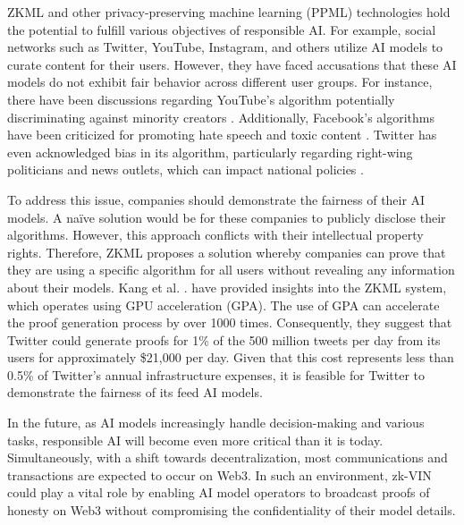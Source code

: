 \documentclass[conference]{IEEEtran}
\begin{document}
ZKML and other privacy-preserving machine learning (PPML) technologies hold the potential to fulfill various objectives of responsible AI. For example, social networks such as Twitter, YouTube, Instagram, and others utilize AI models to curate content for their users. However, they have faced accusations that these AI models do not exhibit fair behavior across different user groups. For instance, there have been discussions regarding YouTube's algorithm potentially discriminating against minority creators \cite{YoutubeAlgorithmHackernoon}. Additionally, Facebook's algorithms have been criticized for promoting hate speech and toxic content \cite{FacebookAlgorithmPeoplesDispatch}. Twitter has even acknowledged bias in its algorithm, particularly regarding right-wing politicians and news outlets, which can impact national policies \cite{TwitterBiasTheGuardian}.



To address this issue, companies should demonstrate the fairness of their AI models. A naïve solution would be for these companies to publicly disclose their algorithms. However, this approach conflicts with their intellectual property rights. Therefore, ZKML proposes a solution whereby companies can prove that they are using a specific algorithm for all users without revealing any information about their models. Kang et al. \cite{TensorPlonkMedium}. have provided insights into the ZKML system, which operates using GPU acceleration (GPA). The use of GPA can accelerate the proof generation process by over 1000 times. Consequently, they suggest that Twitter could generate proofs for 1\% of the 500 million tweets per day from its users for approximately \$21,000 per day. Given that this cost represents less than 0.5\% of Twitter's annual infrastructure expenses, it is feasible for Twitter to demonstrate the fairness of its feed AI models.

In the future, as AI models increasingly handle decision-making and various tasks, responsible AI will become even more critical than it is today. Simultaneously, with a shift towards decentralization, most communications and transactions are expected to occur on Web3. In such an environment, zk-VIN could play a vital role by enabling AI model operators to broadcast proofs of honesty on Web3 without compromising the confidentiality of their model details.
\end{document}
